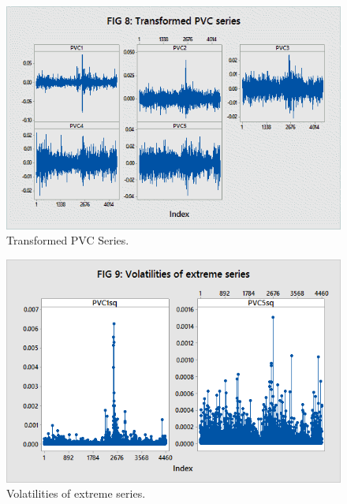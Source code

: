 	\begin{figure}[H]
	\centering
	\includegraphics[width=\textwidth]{chapters/chapter_mvts/figures/transpvc.png}
	\caption{Transformed PVC Series. \label{fig:transpvc}}
	\end{figure}

	\begin{figure}[H]
	\centering
	\includegraphics[width=\textwidth]{chapters/chapter_mvts/figures/volextreme.png}
	\caption{Volatilities of extreme series. \label{fig:volextreme}}
	\end{figure}


